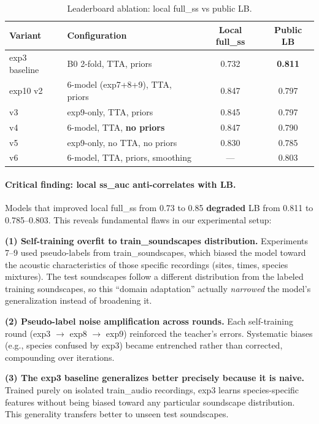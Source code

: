 \begin{table}[h]
\centering
\caption{Leaderboard ablation: local full\_ss vs public LB.}
\label{tab:lb-ablation}
\begin{tabular}{llcc}
\hline
\textbf{Variant} & \textbf{Configuration} & \textbf{Local full\_ss} & \textbf{Public LB} \\
\hline
exp3 baseline     & B0 2-fold, TTA, priors            & 0.732 & \textbf{0.811} \\
exp10 v2          & 6-model (exp7+8+9), TTA, priors   & 0.847 & 0.797 \\
v3                & exp9-only, TTA, priors             & 0.845 & 0.797 \\
v4                & 6-model, TTA, \textbf{no priors}   & 0.847 & 0.790 \\
v5                & exp9-only, no TTA, no priors        & 0.830 & 0.785 \\
v6                & 6-model, TTA, priors, smoothing     & ---   & 0.803 \\
\hline
\end{tabular}
\end{table}

\paragraph{Critical finding: local ss\_auc anti-correlates with LB.}
Models that improved local full\_ss from 0.73 to 0.85 \textbf{degraded} LB from
0.811 to 0.785--0.803. This reveals fundamental flaws in our experimental setup:

\textbf{(1) Self-training overfit to train\_soundscapes distribution.}
Experiments 7--9 used pseudo-labels from train\_soundscapes, which biased the
model toward the acoustic characteristics of those specific recordings (sites,
times, species mixtures). The test soundscapes follow a different distribution
from the labeled training soundscapes, so this ``domain adaptation'' actually
\emph{narrowed} the model's generalization instead of broadening it.

\textbf{(2) Pseudo-label noise amplification across rounds.}
Each self-training round (exp3 $\to$ exp8 $\to$ exp9) reinforced the teacher's
errors. Systematic biases (e.g., species confused by exp3) became entrenched
rather than corrected, compounding over iterations.

\textbf{(3) The exp3 baseline generalizes better precisely because it is naive.}
Trained purely on isolated train\_audio recordings, exp3 learns species-specific
features without being biased toward any particular soundscape distribution.
This generality transfers better to unseen test soundscapes.

